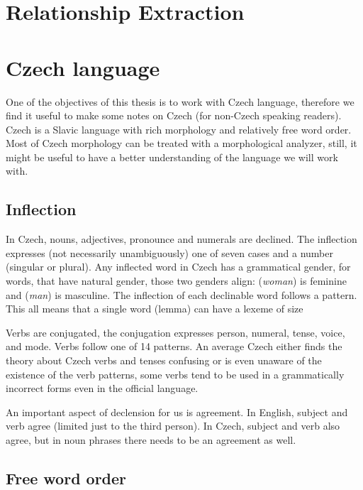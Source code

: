 


\section{Relationship Extraction}

\section{Czech language}
One of the objectives of this thesis is to work with Czech language, therefore we find it useful to make some notes on Czech (for non-Czech speaking readers). Czech is a Slavic language with rich morphology and relatively free word order. Most of Czech morphology can be treated with a morphological analyzer, still, it might be useful to have a better understanding of the language we will work with.

\subsection{Inflection}
In Czech, nouns, adjectives, pronounce and numerals are declined. The inflection expresses (not necessarily unambiguously) one of seven cases and a number (singular or plural). Any inflected word in Czech has a grammatical gender, for words, that have natural gender, those two genders align:  (\textit{woman}) is feminine and  (\textit{man}) is masculine. The inflection of each declinable word follows a pattern. This all means that a single word (lemma) can have a lexeme of size 

Verbs are conjugated, the conjugation expresses person, numeral, tense, voice, and mode. Verbs follow one of 14 patterns. An average Czech either finds the theory about Czech verbs and tenses confusing or is even unaware of the existence of the verb patterns, some verbs tend to be used in a grammatically incorrect forms even in the official language.

An important aspect of declension for us is agreement. In English, subject and verb agree (limited just to the third person). In Czech, subject and verb also agree, but in noun phrases there needs to be an agreement as well.  

\subsection{Free word order}
